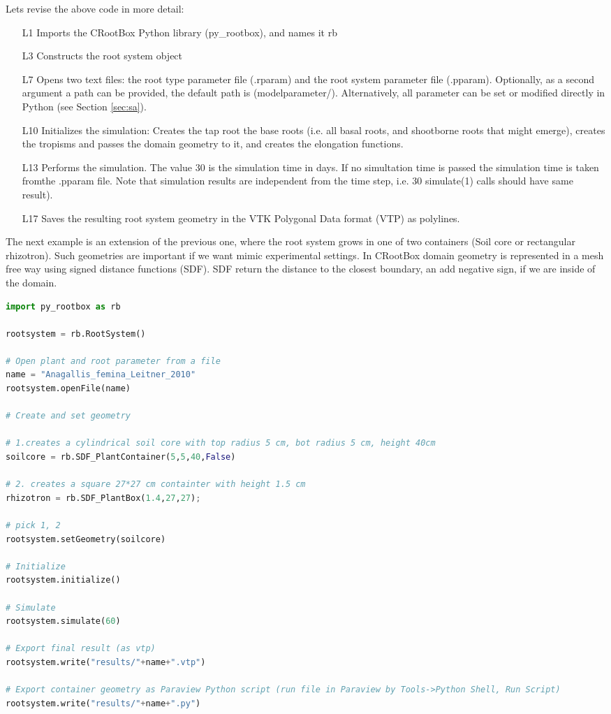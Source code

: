 \documentclass[a4paper]{article}
\begin{document}
\noindent 
Lets revise the above code in more detail: 
\begin{itemize}
 \item[L1] Imports the CRootBox Python library (py\_rootbox), and names it rb
 \item[L3] Constructs the root system object
 \item[L7] Opens two text files: the root type parameter file (.rparam) and the root system parameter file (.pparam). Optionally, as a second argument a path can be provided, the default path is (modelparameter/). 
 Alternatively, all parameter can be set or modified directly in Python (see Section \ref{sec:sa}).
 \item[L10] Initializes the simulation: Creates the tap root the base roots (i.e. all basal roots, and shootborne roots that might emerge), creates the tropisms and passes the domain geometry to it, and creates the elongation functions. 
 \item[L13] Performs the simulation. The value 30 is the simulation time in days. If no simultation time is passed the simulation time is taken fromthe .pparam file. Note that simulation results are independent from the time step, 
 i.e. 30 simulate(1) calls should have same result). 
 \item[L17] Saves the resulting root system geometry in the VTK Polygonal Data format (VTP) as polylines. 
\end{itemize}

The next example is an extension of the previous one, where the root system grows in one of two containers (Soil core or rectangular rhizotron).
Such geometries are important if we want mimic experimental settings. In CRootBox domain geometry is represented in a mesh free way using signed distance functions (SDF).
SDF return the distance to the closest boundary, an add negative sign, if we are inside of the domain.

\begin{lstlisting}[language=Python, caption=Example 1b]
import py_rootbox as rb

rootsystem = rb.RootSystem()

# Open plant and root parameter from a file
name = "Anagallis_femina_Leitner_2010" 
rootsystem.openFile(name)

# Create and set geometry

# 1.creates a cylindrical soil core with top radius 5 cm, bot radius 5 cm, height 40cm
soilcore = rb.SDF_PlantContainer(5,5,40,False)

# 2. creates a square 27*27 cm containter with height 1.5 cm
rhizotron = rb.SDF_PlantBox(1.4,27,27);

# pick 1, 2
rootsystem.setGeometry(soilcore) 

# Initialize
rootsystem.initialize() 

# Simulate
rootsystem.simulate(60)

# Export final result (as vtp)
rootsystem.write("results/"+name+".vtp") 

# Export container geometry as Paraview Python script (run file in Paraview by Tools->Python Shell, Run Script)    
rootsystem.write("results/"+name+".py") 
\end{lstlisting}
\end{document}

